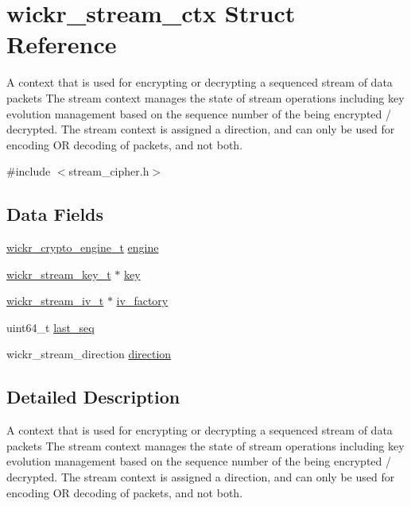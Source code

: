 \hypertarget{structwickr__stream__ctx}{}\section{wickr\+\_\+stream\+\_\+ctx Struct Reference}
\label{structwickr__stream__ctx}


A context that is used for encrypting or decrypting a sequenced stream of data packets The stream context manages the state of stream operations including key evolution management based on the sequence number of the being encrypted / decrypted. The stream context is assigned a direction, and can only be used for encoding OR decoding of packets, and not both.  




{\ttfamily \#include $<$stream\+\_\+cipher.\+h$>$}

\subsection*{Data Fields}
\begin{DoxyCompactItemize}
\item 
\hyperlink{structwickr__crypto__engine}{wickr\+\_\+crypto\+\_\+engine\+\_\+t} \hyperlink{structwickr__stream__ctx_a14ef322bbeec579ded7f35c5aeb0d3fa}{engine}
\item 
\hyperlink{structwickr__stream__key}{wickr\+\_\+stream\+\_\+key\+\_\+t} $\ast$ \hyperlink{structwickr__stream__ctx_a3598b3c0415d13fafab6633f8c00a3c8}{key}
\item 
\hyperlink{structwickr__stream__iv}{wickr\+\_\+stream\+\_\+iv\+\_\+t} $\ast$ \hyperlink{structwickr__stream__ctx_a67c5066e87dbdc026358563daa51f174}{iv\+\_\+factory}
\item 
uint64\+\_\+t \hyperlink{structwickr__stream__ctx_abf2c6ab54e1663e6a47e310fd68b3b3f}{last\+\_\+seq}
\item 
wickr\+\_\+stream\+\_\+direction \hyperlink{structwickr__stream__ctx_a34c622c3ca61348321261ee7a9c3ff91}{direction}
\end{DoxyCompactItemize}


\subsection{Detailed Description}
A context that is used for encrypting or decrypting a sequenced stream of data packets The stream context manages the state of stream operations including key evolution management based on the sequence number of the being encrypted / decrypted. The stream context is assigned a direction, and can only be used for encoding OR decoding of packets, and not both. 

